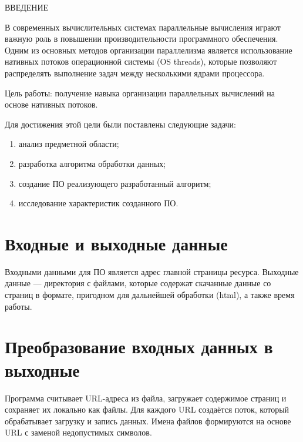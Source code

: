 \begin{center}
    \MakeUppercase{Введение}
\end{center}

В современных вычислительных системах параллельные вычисления играют важную роль в повышении производительности программного обеспечения. Одним из основных методов организации параллелизма является использование нативных потоков операционной системы (OS threads), которые позволяют распределять выполнение задач между несколькими ядрами процессора.
\vspace{0.25cm}

Цель работы: получение навыка организации параллельных вычислений на основе нативных потоков.

\vspace{0.25cm}
Для достижения этой цели были поставлены следующие задачи:

\begin{enumerate}

\item анализ предметной области;
\item разработка алгоритма обработки данных;
\item создание ПО реализующего разработанный алгоритм;
\item исследование характеристик созданного ПО.

\end{enumerate}

\section{Входные и выходные данные}

\hspace{1.25cm}
Входными данными для ПО является адрес главной страницы ресурса. Выходные данные --- директория с файлами, которые содержат скачанные данные со страниц в формате, пригодном для дальнейшей обработки (html), а также время работы.

\section{Преобразование входных данных в выходные}

\hspace{1.25cm}
Программа считывает URL-адреса из файла, загружает содержимое страниц и сохраняет их локально как файлы. Для каждого URL создаётся поток, который обрабатывает загрузку и запись данных. Имена файлов формируются на основе URL с заменой недопустимых символов.
